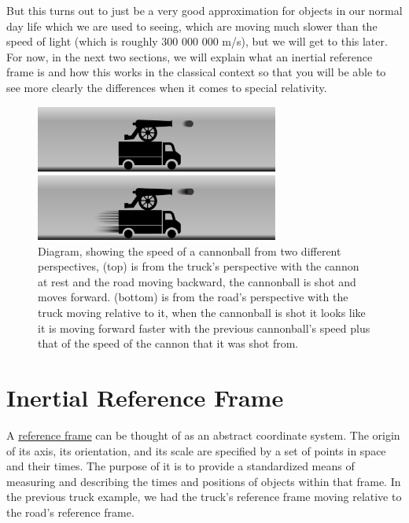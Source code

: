 But this turns out to just be a very good approximation for objects in our normal day life which we are used to seeing, which are moving much slower than the speed of light (which is roughly 300 000 000 m/s), but we will get to this later. For now, in the next two sections, we will explain what an inertial reference frame is and how this works in the classical context so that you will be able to see more clearly the differences when it comes to special relativity.

\begin{figure}[H]
	\centering
	\includegraphics[width=8cm]{images/pdf/lorry_cannonball.pdf}
	\caption{Diagram, showing the speed of a cannonball from two different perspectives, (top) is from the truck's perspective with the cannon at rest and the road moving backward, the cannonball is shot and moves forward. (bottom) is from the road's perspective with the truck moving relative to it, when the cannonball is shot it looks like it is moving forward faster with the previous cannonball's speed plus that of the speed of the cannon that it was shot from.}
	\label{fig: truck cannonball}
\end{figure}

\section{Inertial Reference Frame}

A \hyperlink{def-Reference-frame}{reference frame} can be thought of as an abstract coordinate system. The origin of its axis, its orientation, and its scale are specified by a set of points in space and their times. The purpose of it is to provide a standardized means of measuring and describing the times and positions of objects within that frame. In the previous truck example, we had the truck's reference frame moving relative to the road's reference frame.


